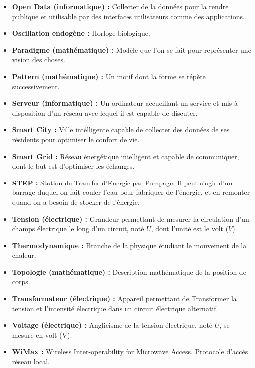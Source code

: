 \begin{itemize}
    \item \textbf{Open Data (informatique) :} Collecter de la données pour la rendre publique et utilisable par des interfaces utilisateurs comme des applications.
    \item \textbf{Oscillation endogène :} Horloge biologique.
    \item \textbf{Paradigme (mathématique) :} Modèle que l'on se fait pour représenter une vision des choses.
    \item \textbf{Pattern (mathématique) :} Un motif dont la forme se répète successivement.
    \item \textbf{Serveur (informatique) :} Un ordinateur accueillant un service et mis à disposition d'un réseau avec lequel il est capable de discuter.
    \item \textbf{Smart City :} Ville intélligente capable de collecter des données de ses résidents pour optimiser le confort de vie.
    \item \textbf{Smart Grid :} Réseau énergétique intelligent et capable de communiquer, dont le but est d'optimiser les échanges.
    \item \textbf{STEP :} Station de Transfer d'Energie par Pompage.
Il peut s'agir d'un barrage duquel on fait couler l'eau pour fabriquer de l'énergie, et en remonter quand on a besoin de stocker de l'énergie.
    \item \textbf{Tension (électrique) :} Grandeur permettant de mesurer la circulation d'un champs électrique le long d'un circuit, noté $U$, dont l'unité est le volt ($V$).
    \item \textbf{Thermodynamique :} Branche de la physique étudiant le mouvement de la chaleur.
    \item \textbf{Topologie (mathématique) :} Description mathématique de la position de corps.
    \item \textbf{Transformateur (électrique) :} Appareil permettant de Transformer la tension et l'intensité électrique dans un circuit électrique alternatif.
    \item \textbf{Voltage (électrique) :} Anglicisme de la tension électrique, noté $U$, se mesure en volt (V).
    \item \textbf{WiMax :} Wireless Inter-operability for Microwave Access. Protocole d'accès réseau local.
\end{itemize}
